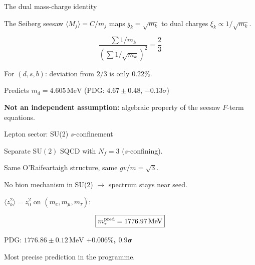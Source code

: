 \documentclass[aspectratio=169,12pt]{beamer}
\newcommand{\MeV}{\,\text{MeV}}
\newcommand{\zch}{\mathfrak{z}}
\begin{document}
\begin{frame}{The dual mass-charge identity}

The Seiberg seesaw $\langle M_j\rangle = C/m_j$ maps
$\zch_k = \sqrt{m_k}$ to dual charges
$\xi_k \propto 1/\sqrt{m_k}$.

\begin{equation*}
\frac{\sum 1/m_k}{(\sum 1/\sqrt{m_k})^2} = \frac{2}{3}
\end{equation*}

\medskip
For $(d,s,b)$: deviation from $2/3$ is only $0.22\%$.

\medskip
Predicts $m_d = 4.605\MeV$ \quad (PDG: $4.67 \pm 0.48$, $-0.13\sigma$)

\bigskip
\textbf{Not an independent assumption:} algebraic property
of the seesaw $F$-term equations.

\end{frame}

\begin{frame}{Lepton sector: SU(2) $s$-confinement}

Separate $\mathrm{SU}(2)$ SQCD with $N_f = 3$ ($s$-confining).

Same O'Raifeartaigh structure, same $gv/m = \sqrt{3}$.

\bigskip
No bion mechanism in SU(2) $\to$ spectrum stays near seed.

\bigskip
$\langle z_k^2\rangle = z_0^2$ on $(m_e, m_\mu, m_\tau)$:

\begin{equation*}
\boxed{m_\tau^{\rm pred} = 1776.97\MeV}
\end{equation*}

\begin{center}
PDG: $1776.86 \pm 0.12\MeV$ \qquad
\textbf{$+0.006\%$, $\mathbf{0.9\sigma}$}
\end{center}

\medskip
Most precise prediction in the programme.

\end{frame}
\end{document}
